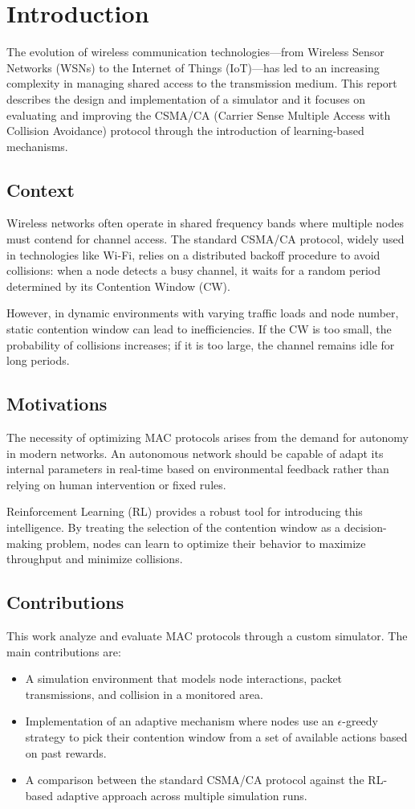 \chapter{Introduction}
The evolution of wireless communication technologies—from Wireless Sensor Networks (WSNs) to the Internet of Things (IoT)—has led to an increasing complexity in managing shared access to the transmission medium. This report describes the design and implementation of a simulator and it focuses on evaluating and improving the CSMA/CA (Carrier Sense Multiple Access with Collision Avoidance) protocol through the introduction of learning-based mechanisms.

\section{Context}
Wireless networks often operate in shared frequency bands where multiple nodes must contend for channel access. The standard CSMA/CA protocol, widely used in technologies like Wi-Fi, relies on a distributed backoff procedure to avoid collisions: when a node detects a busy channel, it waits for a random period determined by its Contention Window (CW).

However, in dynamic environments with varying traffic loads and node number, static contention window can lead to inefficiencies. If the CW is too small, the probability of collisions increases; if it is too large, the channel remains idle for long periods.

\section{Motivations}
The necessity of optimizing MAC protocols arises from the demand for autonomy in modern networks. An autonomous network should be capable of adapt its internal parameters in real-time based on environmental feedback rather than relying on human intervention or fixed rules.

Reinforcement Learning (RL) provides a robust tool for introducing this intelligence. By treating the selection of the contention window as a decision-making problem, nodes can learn to optimize their behavior to maximize throughput and minimize collisions.

\section{Contributions}
This work analyze and evaluate MAC protocols through a custom simulator. The main contributions are:
\begin{itemize}
    \item A simulation environment that models node interactions, packet transmissions, and collision in a monitored area.
    \item Implementation of an adaptive mechanism where nodes use an $\epsilon$-greedy strategy to pick their contention window from a set of available actions based on past rewards.
    \item A comparison between the standard CSMA/CA protocol against the RL-based adaptive approach across multiple simulation runs.
\end{itemize}
